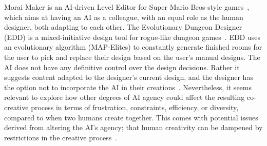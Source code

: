 



Morai Maker is an AI-driven Level Editor for Super Mario Bros-style games~, which aims at having an AI as a colleague, with an equal role as the human designer, both adapting to each other. The Evolutionary Dungeon Designer (EDD) is a mixed-initiative design tool for rogue-like dungeon games~. EDD uses an evolutionary algorithm (MAP-Elites) to constantly generate finished rooms for the user to pick and replace their design based on the user's manual designs. The AI does not have any definitive control over the design decisions. Rather it suggests content adapted to the designer's current design, and the designer has the option not to incorporate the AI in their creations~. Nevertheless, it seems relevant to explore how other degrees of AI agency could affect the resulting co-creative process in terms of frustration, constraints, efficiency, or diversity, compared to when two humans create together. This comes with potential issues derived from altering the AI's agency; that human creativity can be dampened by restrictions in the creative process~.


